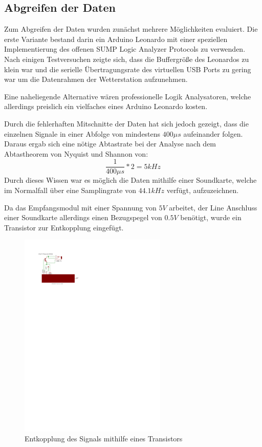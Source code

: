 \documentclass{report}
\begin{document}
\subsection{Abgreifen der Daten}
Zum Abgreifen der Daten wurden zunächst mehrere Möglichkeiten evaluiert. 
Die erste Variante bestand darin ein Arduino Leonardo\cite{ArduinoLeonardo} mit einer speziellen Implementierung des offenen SUMP Logic Analyzer Protocols\cite{SUMP} zu verwenden. Nach einigen Testversuchen zeigte sich, dass die Buffergröße des Leonardos zu klein war und die serielle Übertragungsrate des virtuellen USB Ports zu gering war um die Datenrahmen der Wetterstation aufzunehmen. 

Eine naheliegende Alternative wären professionelle Logik Analysatoren, welche allerdings preislich ein vielfaches eines Arduino Leonardo kosten.

Durch die fehlerhaften Mitschnitte der Daten hat sich jedoch gezeigt, dass die einzelnen Signale in einer Abfolge von mindestens $400\mu s$ aufeinander folgen. Daraus ergab sich eine nötige Abtastrate bei der Analyse nach dem Abtastheorem von Nyquist\cite{Nyquist1928} und Shannon von:
\begin{equation*}
    \frac{1}{400\mu s}*2=5kHz
\end{equation*}
Durch dieses Wissen war es möglich die Daten mithilfe einer Soundkarte, welche im Normalfall über eine Samplingrate von $44.1kHz$ verfügt, aufzuzeichnen. 

Da das Empfangsmodul mit einer Spannung von $5V$ arbeitet, der Line Anschluss einer Soundkarte allerdings einen Bezugspegel von $0.5V$ benötigt, wurde ein Transistor zur Entkopplung eingefügt.
\begin{figure}[!htbp]
    \begin{center}
        \includegraphics[width=7cm]{Bilder/433MHZAnschluss.pdf}
    \end{center}
    \label{433MHZAnschluss}
    \caption{Entkopplung des Signals mithilfe eines Transistors}
\end{figure}
\end{document}
